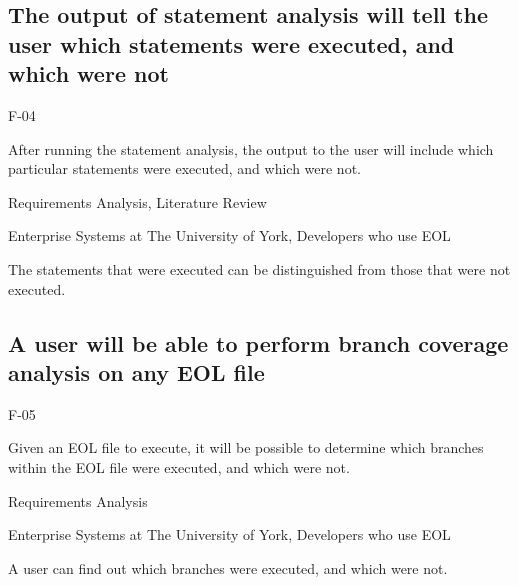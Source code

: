 \subsection{The output of statement analysis will tell the user which statements were executed, and which were not}
\begin{description}[style=sameline,leftmargin=4.5cm,nolistsep]
\item[\hspace*{0.3cm}Label] F-04
\item[\hspace*{0.3cm}Description] After running the statement analysis, the output to the user will include which particular statements were executed, and which were not.
\item[\hspace*{0.3cm}Source] Requirements Analysis, Literature Review
\item[\hspace*{0.3cm}Stakeholders] Enterprise Systems at The University of York, Developers who use EOL
\item[\hspace*{0.3cm}Satisfiable Conditions] The statements that were executed can be distinguished from those that were not executed.
\end{description}

\subsection{A user will be able to perform branch coverage analysis on any EOL file}
\begin{description}[style=sameline,leftmargin=4.5cm,nolistsep]
\item[\hspace*{0.3cm}Label] F-05
\item[\hspace*{0.3cm}Description] Given an EOL file to execute, it will be possible to determine which branches within the EOL file were executed, and which were not.
\item[\hspace*{0.3cm}Source] Requirements Analysis
\item[\hspace*{0.3cm}Stakeholders] Enterprise Systems at The University of York, Developers who use EOL
\item[\hspace*{0.3cm}Satisfiable Conditions] A user can find out which branches were executed, and which were not.
\end{description}

